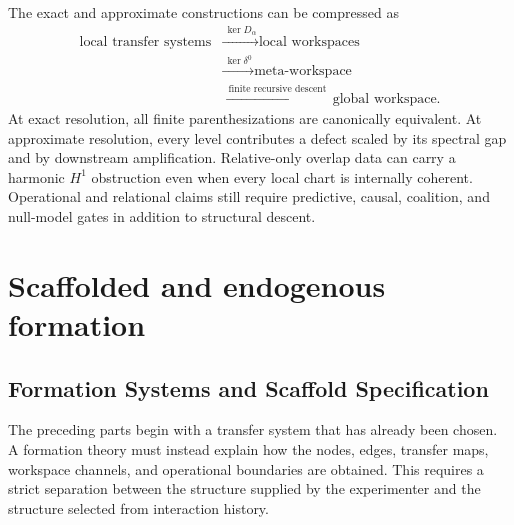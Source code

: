 
The exact and approximate constructions can be compressed as
\[
\boxed{
\begin{aligned}
\text{local transfer systems}
&\xrightarrow{\ \ker D_\alpha\ }
\text{local workspaces}\\
&\xrightarrow{\ \ker\delta^0\ }
\text{meta-workspace}\\
&\xrightarrow{\ \text{finite recursive descent}\ }
\text{global workspace}.
\end{aligned}
}
\]
At exact resolution, all finite parenthesizations are canonically equivalent.
At approximate resolution, every level contributes a defect scaled by its
spectral gap and by downstream amplification. Relative-only overlap data can
carry a harmonic \(H^1\) obstruction even when every local chart is internally
coherent. Operational and relational claims still require predictive, causal,
coalition, and null-model gates in addition to structural descent.


\chapter{Scaffolded and endogenous formation}\label{SRWT:book:chapter-80}


\section{Formation Systems and Scaffold Specification}

The preceding parts begin with a transfer system that has already been chosen.
A formation theory must instead explain how the nodes, edges, transfer maps,
workspace channels, and operational boundaries are obtained. This requires a
strict separation between the structure supplied by the experimenter and the
structure selected from interaction history.

